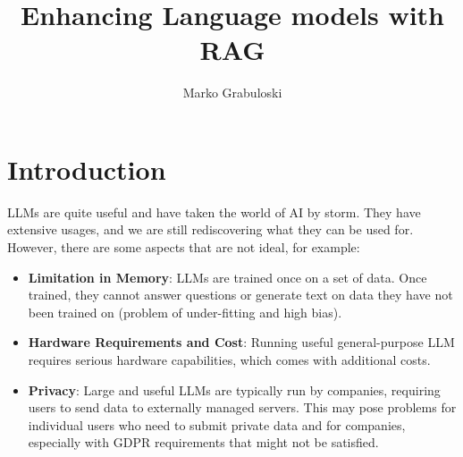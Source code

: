 \documentclass{wseas}
\author{Marko Grabuloski}
\title{Enhancing Language models with RAG}
\begin{document}


\section{Introduction}

LLMs are quite useful and have taken the world of AI by storm. They have
extensive usages, and we are still rediscovering what they can be used
for. However, there are some aspects that are not ideal, for example:

\begin{itemize}

\item
  \textbf{Limitation in Memory}: LLMs are trained once on a set of data.
  Once trained, they cannot answer questions or generate text on data
  they have not been trained on (problem of under-fitting and high
  bias).
\item
  \textbf{Hardware Requirements and Cost}: Running useful
  general-purpose LLM requires serious hardware capabilities, which
  comes with additional costs.
\item
  \textbf{Privacy}: Large and useful LLMs are typically run by
  companies, requiring users to send data to externally managed servers.
  This may pose problems for individual users who need to submit private
  data and for companies, especially with GDPR requirements that might
  not be satisfied.
\end{itemize}
\end{document}
